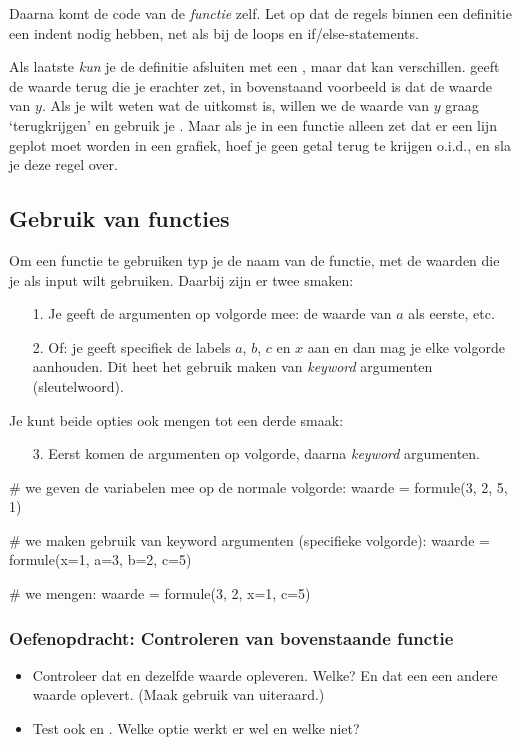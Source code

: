 \documentclass[a4paper,11pt, fleqn]{article}
\begin{document}
Daarna komt de code van de \textit{functie} zelf. Let op dat de regels binnen een definitie een indent nodig hebben, net als bij de loops en if/else-statements.

Als laatste {\it kun} je de definitie afsluiten met een , maar dat kan verschillen.  geeft de waarde terug die je erachter zet, in bovenstaand voorbeeld is dat de waarde van $y$. Als je wilt weten wat de uitkomst is, willen we de waarde van $y$ graag `terugkrijgen' en gebruik je . Maar als je in een functie alleen zet dat er een lijn geplot moet worden in een grafiek, hoef je geen getal terug te krijgen o.i.d., en sla je deze regel over.

\subsection{Gebruik van functies}
Om een functie te gebruiken typ je de naam van de functie, met de waarden die je als input wilt gebruiken. Daarbij zijn er twee smaken:

\begin{itemize}
	\item[1.] Je geeft de argumenten op volgorde mee: de waarde van $a$ als eerste, etc.
	\item[2.] Of: je geeft specifiek de labels $a$, $b$, $c$ en $x$ aan en dan mag je elke volgorde aanhouden. Dit heet het gebruik maken van {\it keyword} argumenten (sleutelwoord).
\end{itemize}

Je kunt beide opties ook mengen tot een derde smaak:

\begin{itemize}
	\item[3.] Eerst komen de argumenten op volgorde, daarna {\it keyword} argumenten.
\end{itemize}

\begin{python}
	# we geven de variabelen mee op de normale volgorde:
	waarde = formule(3, 2, 5, 1)
	
	# we maken gebruik van keyword argumenten (specifieke volgorde):
	waarde = formule(x=1, a=3, b=2, c=5)
	
	# we mengen:
	waarde = formule(3, 2, x=1, c=5)
\end{python}

\subsubsection*{Oefenopdracht: Controleren van bovenstaande functie}
\begin{itemize}
	\item Controleer dat  en   dezelfde waarde opleveren. Welke? En dat een  een andere waarde oplevert. (Maak gebruik van  uiteraard.)
	\item Test ook  en . Welke optie werkt er wel en welke niet?
\end{itemize}
\end{document}
